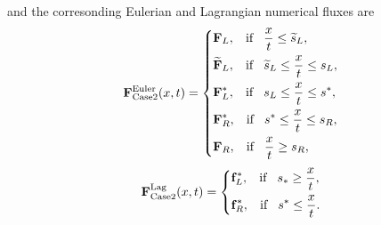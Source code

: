 \documentclass[review]{elsarticle}
\begin{document}
  and the corresonding Eulerian and Lagrangian numerical fluxes are
 \begin{equation}\label{eq:HLLCEP}
   \mathbf{F}^{\text{Euler}}_{\text{Case2}}(x,t) = \left\{ \begin{aligned}
       & \mathbf{F}_L, \hspace{0.3cm} \text{if} \hspace{0.3cm} \frac{x}{t}\le \widetilde{s}_L, \\
        &  \widetilde{\mathbf{F}}_L, \hspace{0.3cm} \text{if} \hspace{0.3cm} \widetilde{s}_L\le \frac{x}{t} \le   s_L , \\
        &\mathbf{F}_L^*, \hspace{0.3cm} \text{if} \hspace{0.3cm} s_L\le \frac{x}{t} \le s^*, \\
        & \mathbf{F}_R^*, \hspace{0.3cm} \text{if} \hspace{0.3cm} s^*\le \frac{x}{t} \le s_R,\\
        & \mathbf{F}_R, \hspace{0.3cm} \text{if} \hspace{0.3cm} \frac{x}{t}\ge s_R, \\
      \end{aligned}
    \right.
  \end{equation}
\begin{equation}
    \mathbf{F}^{\text{Lag}}_{\text{Case2}}(x,t) = \left\{ \begin{aligned}
        & \mathbf{f}_L^*, \hspace{0.3cm} \text{if} \hspace{0.3cm} s_*\ge \frac{x}{t},\\
        & \mathbf{f}_R^*, \hspace{0.3cm} \text{if} \hspace{0.3cm} s^*\le \frac{x}{t}.\\
      \end{aligned}
    \right.
  \end{equation}
\end{document}
